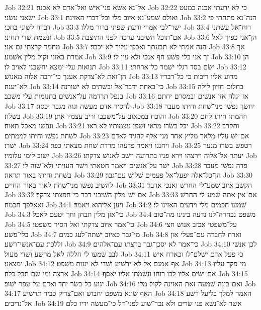 Job 32:21  אל־נא אשׂא פני־אישׁ ואל־אדם לא אכנה׃
Job 32:22  כי לא ידעתי אכנה כמעט ישׂאני עשׂני׃
Job 33:1  ואולם שׁמע־נא איוב מלי וכל־דברי האזינה׃
Job 33:2  הנה־נא פתחתי פי דברה לשׁוני בחכי׃
Job 33:3  ישׁר־לבי אמרי ודעת שׂפתי ברור מללו׃
Job 33:4  רוח־אל עשׂתני ונשׁמת שׁדי תחיני׃
Job 33:5  אם־תוכל השׁיבני ערכה לפני התיצבה׃
Job 33:6  הן־אני כפיך לאל מחמר קרצתי גם־אני׃
Job 33:7  הנה אמתי לא תבעתך ואכפי עליך לא־יכבד׃
Job 33:8  אך אמרת באזני וקול מלין אשׁמע׃
Job 33:9  זך אני בלי פשׁע חף אנכי ולא עון לי׃
Job 33:10  הן תנואות עלי ימצא יחשׁבני לאויב לו׃
Job 33:11  ישׂם בסד רגלי ישׁמר כל־ארחתי׃
Job 33:12  הן־זאת לא־צדקת אענך כי־ירבה אלוה מאנושׁ׃
Job 33:13  מדוע אליו ריבות כי כל־דבריו לא־יענה׃
Job 33:14  כי־באחת ידבר־אל ובשׁתים לא ישׁורנה׃
Job 33:15  בחלום חזיון לילה בנפל תרדמה על־אנשׁים בתנומות עלי משׁכב׃
Job 33:16  אז יגלה אזן אנשׁים ובמסרם יחתם׃
Job 33:17  להסיר אדם מעשׂה וגוה מגבר יכסה׃
Job 33:18  יחשׂך נפשׁו מני־שׁחת וחיתו מעבר בשׁלח׃
Job 33:19  והוכח במכאוב על־משׁכבו וריב עצמיו אתן׃
Job 33:20  וזהמתו חיתו לחם ונפשׁו מאכל תאוה׃
Job 33:21  יכל בשׂרו מראי ושׁפי עצמותיו לא ראו׃
Job 33:22  ותקרב לשׁחת נפשׁו וחיתו לממתים׃
Job 33:23  אם־ישׁ עליו מלאך מליץ אחד מני־אלף להגיד לאדם ישׁרו׃
Job 33:24  ויחננו ויאמר פדעהו מרדת שׁחת מצאתי כפר׃
Job 33:25  רטפשׁ בשׂרו מנער ישׁוב לימי עלומיו׃
Job 33:26  יעתר אל־אלוה וירצהו וירא פניו בתרועה וישׁב לאנושׁ צדקתו׃
Job 33:27  ישׁר על־אנשׁים ויאמר חטאתי וישׁר העויתי ולא־שׁוה לי׃
Job 33:28  פדה נפשׁי מעבר בשׁחת וחיתי באור תראה׃
Job 33:29  הן־כל־אלה יפעל־אל פעמים שׁלושׁ עם־גבר׃
Job 33:30  להשׁיב נפשׁו מני־שׁחת לאור באור החיים׃
Job 33:31  הקשׁב איוב שׁמע־לי החרשׁ ואנכי אדבר׃
Job 33:32  אם־ישׁ־מלין השׁיבני דבר כי־חפצתי צדקך׃
Job 33:33  אם־אין אתה שׁמע־לי החרשׁ ואאלפך חכמה׃
Job 34:1  ויען אליהוא ויאמר׃
Job 34:2  שׁמעו חכמים מלי וידעים האזינו לי׃
Job 34:3  כי־אזן מלין תבחן וחך יטעם לאכל׃
Job 34:4  משׁפט נבחרה־לנו נדעה בינינו מה־טוב׃
Job 34:5  כי־אמר איוב צדקתי ואל הסיר משׁפטי׃
Job 34:6  על־משׁפטי אכזב אנושׁ חצי בלי־פשׁע׃
Job 34:7  מי־גבר כאיוב ישׁתה־לעג כמים׃
Job 34:8  וארח לחברה עם־פעלי און וללכת עם־אנשׁי־רשׁע׃
Job 34:9  כי־אמר לא יסכן־גבר ברצתו עם־אלהים׃
Job 34:10  לכן אנשׁי לבב שׁמעו לי חללה לאל מרשׁע ושׁדי מעול׃
Job 34:11  כי פעל אדם ישׁלם־לו וכארח אישׁ ימצאנו׃
Job 34:12  אף־אמנם אל לא־ירשׁיע ושׁדי לא־יעות משׁפט׃
Job 34:13  מי־פקד עליו ארצה ומי שׂם תבל כלה׃
Job 34:14  אם־ישׂים אליו לבו רוחו ונשׁמתו אליו יאסף׃
Job 34:15  יגוע כל־בשׂר יחד ואדם על־עפר ישׁוב׃
Job 34:16  ואם־בינה שׁמעה־זאת האזינה לקול מלי׃
Job 34:17  האף שׂונא משׁפט יחבושׁ ואם־צדיק כביר תרשׁיע׃
Job 34:18  האמר למלך בליעל רשׁע אל־נדיבים׃
Job 34:19  אשׁר לא־נשׂא פני שׂרים ולא נכר־שׁוע לפני־דל כי־מעשׂה ידיו כלם׃
